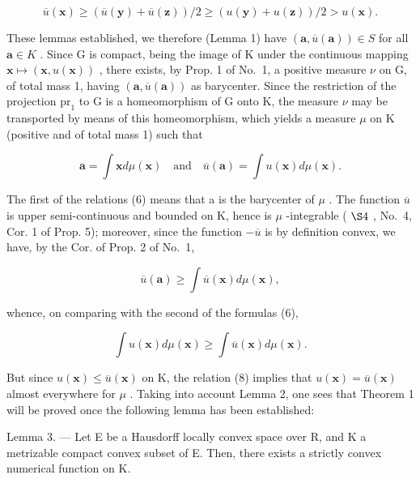 \[
\overline {{{u}}} (\mathbf {x}) \geqslant \left(\overline {{{u}}} (\mathbf {y}) + \overline {{{u}}} (\mathbf {z})\right) / 2 \geqslant \left(u (\mathbf {y}) + u (\mathbf {z})\right) / 2 > u (\mathbf {x}).
\]

These lemmas established, we therefore (Lemma 1) have \((\mathbf{a},\overline{u} (\mathbf{a}))\in S\) for all \(\mathbf{a}\in K\) . Since G is compact, being the image of K under the continuous mapping \(\mathbf{x}\mapsto (\mathbf{x},u(\mathbf{x}))\) , there exists, by Prop. 1 of No.~1, a positive measure \(\nu\) on G, of total mass 1, having \((\mathbf{a},\overline{u} (\mathbf{a}))\) as barycenter. Since the restriction of the projection \(\mathrm{pr}_1\) to G is a homeomorphism of G onto K, the measure \(\nu\) may be transported by means of this homeomorphism, which yields a measure \(\mu\) on K (positive and of total mass 1) such that

\[
\mathbf {a} = \int \mathbf {x} d \mu (\mathbf {x}) \quad \mathrm{and} \quad \overline {{{u}}} (\mathbf {a}) = \int u (\mathbf {x}) d \mu (\mathbf {x}).\tag{6}
\]

The first of the relations (6) means that a is the barycenter of \(\mu\) . The function \(\overline{u}\) is upper semi-continuous and bounded on K, hence is \(\mu\) -integrable ( \(\S4\) , No.~4, Cor. 1 of Prop. 5); moreover, since the function \(-\overline{u}\) is by definition convex, we have, by the Cor. of Prop. 2 of No.~1,

\[
\overline {{{u}}} (\mathbf {a}) \geqslant \int \overline {{{u}}} (\mathbf {x}) d \mu (\mathbf {x}),\tag{7}
\]

whence, on comparing with the second of the formulas (6),

\[
\int u (\mathbf {x}) d \mu (\mathbf {x}) \geqslant \int \overline {{{u}}} (\mathbf {x}) d \mu (\mathbf {x}).\tag{8}
\]

But since \(u(\mathbf{x}) \leqslant \overline{u}(\mathbf{x})\) on K, the relation (8) implies that \(u(\mathbf{x}) = \overline{u}(\mathbf{x})\) almost everywhere for \(\mu\) . Taking into account Lemma 2, one sees that Theorem 1 will be proved once the following lemma has been established:

Lemma 3. --- Let E be a Hausdorff locally convex space over R, and K a metrizable compact convex subset of E. Then, there exists a strictly convex numerical function on K.

